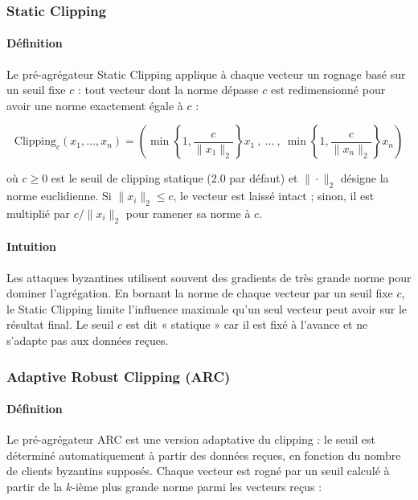 \documentclass[a4paper,11pt]{article}
\begin{document}
\subsubsection{Static Clipping}

\paragraph{Définition}

Le pré-agrégateur Static Clipping applique à chaque vecteur un rognage basé sur un seuil fixe $c$ : tout vecteur dont la norme dépasse $c$ est redimensionné pour avoir une norme exactement égale à $c$ :

\[
\mathrm{Clipping}_c(x_1,\dots,x_n)
=
\left(
\min\!\left\{1, \frac{c}{\|x_1\|_2}\right\} x_1
\ , \ \dots \ , \
\min\!\left\{1, \frac{c}{\|x_n\|_2}\right\} x_n
\right)
\]

où $c \geq 0$ est le seuil de clipping statique (2.0 par défaut) et $\|\cdot\|_2$ désigne la norme euclidienne. Si $\|x_i\|_2 \leq c$, le vecteur est laissé intact ; sinon, il est multiplié par $c / \|x_i\|_2$ pour ramener sa norme à $c$.

\paragraph{Intuition}

Les attaques byzantines utilisent souvent des gradients de très grande norme pour dominer l'agrégation. En bornant la norme de chaque vecteur par un seuil fixe $c$, le Static Clipping limite l'influence maximale qu'un seul vecteur peut avoir sur le résultat final. Le seuil $c$ est dit « statique » car il est fixé à l'avance et ne s'adapte pas aux données reçues.

\subsubsection{Adaptive Robust Clipping (ARC)}

\paragraph{Définition}

Le pré-agrégateur ARC est une version adaptative du clipping : le seuil est déterminé automatiquement à partir des données reçues, en fonction du nombre de clients byzantins supposés. Chaque vecteur est rogné par un seuil calculé à partir de la $k$-ième plus grande norme parmi les vecteurs reçus :
\end{document}
